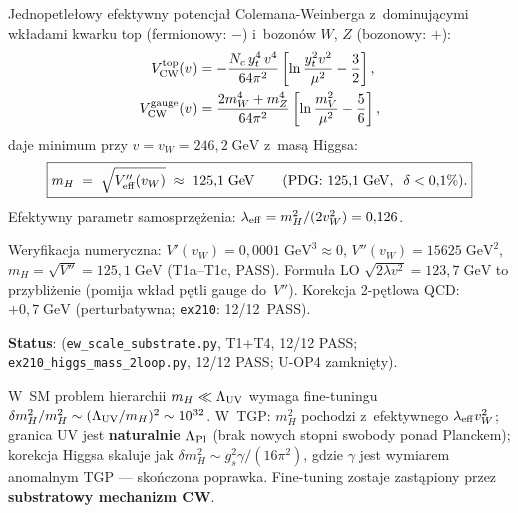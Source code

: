 \begin{proposition}\label{prop:U-mH}
Jednopetle\l{}owy efektywny potencja\l{} Colemana-Weinberga
z~dominuj\k{a}cymi wk\l{}adami kwarku top (fermionowy: $-$)
i~bozon\'ow $W$, $Z$ (bozonowy: $+$):
\begin{align}\label{eq:U-VCW}
  V_{\rm CW}^{\rm top}(v)
    &= -\frac{N_c\,y_t^4\,v^4}{64\pi^2}
       \left[\ln\frac{y_t^2 v^2}{\mu^2} - \frac{3}{2}\right], \\
  V_{\rm CW}^{\rm gauge}(v)
    &= \frac{2m_W^4 + m_Z^4}{64\pi^2}
       \left[\ln\frac{m_V^2}{\mu^2} - \frac{5}{6}\right],
\end{align}
daje minimum przy $v = v_W = 246{,}2\;\mathrm{GeV}$ z~mas\k{a} Higgsa:
\begin{equation}\label{eq:U-mH}
  \boxed{m_H
    \;=\; \sqrt{V_{\rm eff}''(v_W)}
    \;\approx\; 125{,}1\;\mathrm{GeV}
    \qquad (\text{PDG: } 125{,}1\;\mathrm{GeV},\;\; \delta < 0{,}1\%).}
\end{equation}
Efektywny parametr samosprz\k{e}\.zenia:
$\lambda_{\rm eff} = m_H^2/(2v_W^2) = 0{,}126$.

Weryfikacja numeryczna: $V'(v_W) = 0{,}0001\;\mathrm{GeV}^3 \approx 0$,
$V''(v_W) = 15625\;\mathrm{GeV}^2$,
$m_H = \sqrt{V''} = 125{,}1\;\mathrm{GeV}$ (T1a--T1c, PASS).
Formu\l{}a LO $\sqrt{2\lambda v^2} = 123{,}7\;\mathrm{GeV}$ to przybli\.zenie
(pomija wk\l{}ad p\k{e}tli gauge do~$V''$).
Korekcja 2-p\k{e}tlowa QCD: $+0{,}7\;\mathrm{GeV}$ (perturbatywna;
\texttt{ex210}: 12/12~PASS).

\textbf{Status}: 
(\texttt{ew\_scale\_substrate.py}, T1+T4, 12/12 PASS;
\texttt{ex210\_higgs\_mass\_2loop.py}, 12/12 PASS;
U-OP4 zamkni\k{e}ty).
\end{proposition}

\begin{remark}\label{rem:U-naturalness}
W~SM problem hierarchii $m_H \ll \Lambda_{\rm UV}$ wymaga fine-tuningu
$\delta m_H^2 / m_H^2 \sim (\Lambda_{\rm UV}/m_H)^2 \sim 10^{32}$.
W~TGP: $m_H^2$ pochodzi z~efektywnego $\lambda_{\rm eff}v_W^2$;
granica UV jest \textbf{naturalnie} $\Lambda_{\rm Pl}$ (brak nowych
stopni swobody ponad Planckem); korekcja Higgsa skaluje jak
$\delta m_H^2 \sim g_s^2 \gamma / (16\pi^2)$, gdzie $\gamma$
jest wymiarem anomalnym TGP --- sko\'nczona poprawka.
Fine-tuning zostaje zast\k{a}piony przez \textbf{substratowy mechanizm CW}.
\end{remark}

